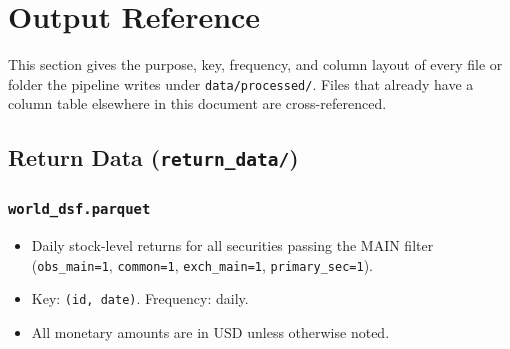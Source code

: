 \documentclass[12pt,title,fleqn]{article}
\begin{document}
\section{Output Reference}\label{sec:output-reference}

This section gives the purpose, key, frequency, and column layout of every file or folder the pipeline writes under \texttt{data/processed/}.  Files that already have a column table elsewhere in this document are cross-referenced.

\subsection{Return Data (\texttt{return\_data/})}

\subsubsection{\texttt{world\_dsf.parquet}}\label{sec:world-dsf}
\begin{itemize}
  \item Daily stock-level returns for all securities passing the MAIN filter (\texttt{obs\_main=1}, \texttt{common=1}, \texttt{exch\_main=1}, \texttt{primary\_sec=1}).
  \item Key: \texttt{(id, date)}.  Frequency: daily.
  \item All monetary amounts are in USD unless otherwise noted.
\end{itemize}
\end{document}
